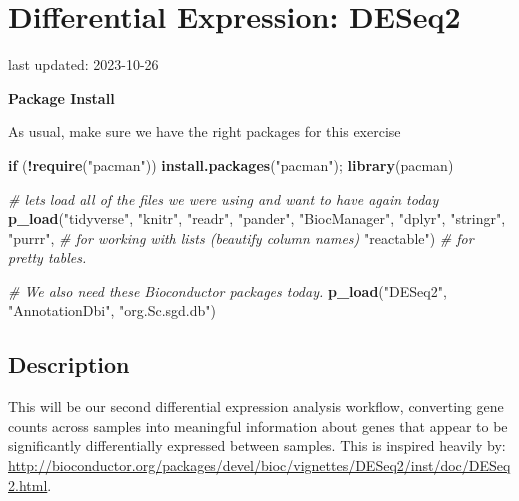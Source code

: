 \documentclass[
]{book}
\newenvironment{Shaded}{\begin{snugshade}}{\end{snugshade}}
\newcommand{\CommentTok}[1]{\textcolor[rgb]{0.56,0.35,0.01}{\textit{#1}}}
\newcommand{\ControlFlowTok}[1]{\textcolor[rgb]{0.13,0.29,0.53}{\textbf{#1}}}
\newcommand{\FunctionTok}[1]{\textcolor[rgb]{0.13,0.29,0.53}{\textbf{#1}}}
\newcommand{\NormalTok}[1]{#1}
\newcommand{\SpecialCharTok}[1]{\textcolor[rgb]{0.81,0.36,0.00}{\textbf{#1}}}
\newcommand{\StringTok}[1]{\textcolor[rgb]{0.31,0.60,0.02}{#1}}
\begin{document}
\hypertarget{differential-expression-deseq2}{%
\chapter{Differential Expression: DESeq2}\label{differential-expression-deseq2}}

last updated: 2023-10-26

\textbf{Package Install}

As usual, make sure we have the right packages for this exercise

\begin{Shaded}
\begin{Highlighting}[]
\ControlFlowTok{if}\NormalTok{ (}\SpecialCharTok{!}\FunctionTok{require}\NormalTok{(}\StringTok{"pacman"}\NormalTok{)) }\FunctionTok{install.packages}\NormalTok{(}\StringTok{"pacman"}\NormalTok{); }\FunctionTok{library}\NormalTok{(pacman)}

\CommentTok{\# let\textquotesingle{}s load all of the files we were using and want to have again today}
\FunctionTok{p\_load}\NormalTok{(}\StringTok{"tidyverse"}\NormalTok{, }\StringTok{"knitr"}\NormalTok{, }\StringTok{"readr"}\NormalTok{,}
       \StringTok{"pander"}\NormalTok{, }\StringTok{"BiocManager"}\NormalTok{, }
       \StringTok{"dplyr"}\NormalTok{, }\StringTok{"stringr"}\NormalTok{, }
       \StringTok{"purrr"}\NormalTok{, }\CommentTok{\# for working with lists (beautify column names)}
       \StringTok{"reactable"}\NormalTok{) }\CommentTok{\# for pretty tables.}

\CommentTok{\# We also need these Bioconductor packages today.}
\FunctionTok{p\_load}\NormalTok{(}\StringTok{"DESeq2"}\NormalTok{, }\StringTok{"AnnotationDbi"}\NormalTok{, }\StringTok{"org.Sc.sgd.db"}\NormalTok{)}
\end{Highlighting}
\end{Shaded}

\hypertarget{description-3}{%
\section{Description}\label{description-3}}

This will be our second differential expression analysis workflow, converting gene counts across samples into meaningful information about genes that appear to be significantly differentially expressed between samples. This is inspired heavily by: \url{http://bioconductor.org/packages/devel/bioc/vignettes/DESeq2/inst/doc/DESeq2.html}.
\end{document}

